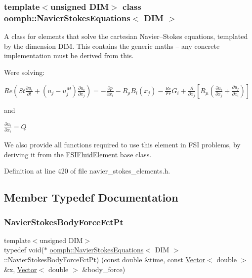 \subsubsection*{template$<$unsigned D\+IM$>$\newline
class oomph\+::\+Navier\+Stokes\+Equations$<$ D\+I\+M $>$}

A class for elements that solve the cartesian Navier--Stokes equations, templated by the dimension D\+IM. This contains the generic maths -- any concrete implementation must be derived from this.

We\textquotesingle{}re solving\+:

$ { Re \left( St \frac{\partial u_i}{\partial t} + (u_j - u_j^{M}) \frac{\partial u_i}{\partial x_j} \right) = - \frac{\partial p}{\partial x_i} - R_\rho B_i(x_j) - \frac{Re}{Fr} G_i + \frac{\partial }{\partial x_j} \left[ R_\mu \left( \frac{\partial u_i}{\partial x_j} + \frac{\partial u_j}{\partial x_i} \right) \right] } $

and

$ { \frac{\partial u_i}{\partial x_i} = Q } $

We also provide all functions required to use this element in F\+SI problems, by deriving it from the \hyperlink{classoomph_1_1FSIFluidElement}{F\+S\+I\+Fluid\+Element} base class. 

Definition at line 420 of file navier\+\_\+stokes\+\_\+elements.\+h.



\subsection{Member Typedef Documentation}
\mbox{\label{classoomph_1_1NavierStokesEquations_a01443cdc37d9aa9d7644c79212108842}} 
\subsubsection{\texorpdfstring{Navier\+Stokes\+Body\+Force\+Fct\+Pt}{NavierStokesBodyForceFctPt}}
{\footnotesize\ttfamily template$<$unsigned D\+IM$>$ \\
typedef void($\ast$ \hyperlink{classoomph_1_1NavierStokesEquations}{oomph\+::\+Navier\+Stokes\+Equations}$<$ D\+IM $>$\+::Navier\+Stokes\+Body\+Force\+Fct\+Pt) (const double \&time, const \hyperlink{classoomph_1_1Vector}{Vector}$<$ double $>$ \&x, \hyperlink{classoomph_1_1Vector}{Vector}$<$ double $>$ \&body\+\_\+force)}



